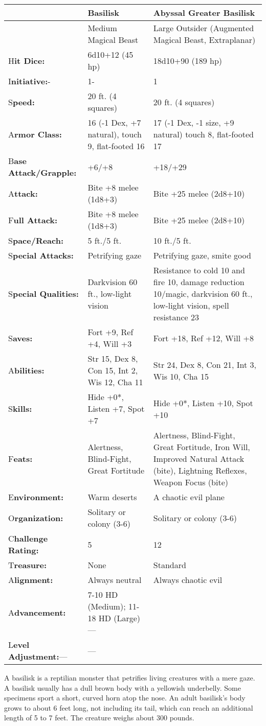 \documentclass{article}
\begin{document}
\begin{tabular}{|>{\raggedright}p{50pt}|>{\raggedright}p{134pt}|>{\raggedright}p{129pt}|}
\hline
  & B\textbf{asilisk} & A\textbf{byssal Greater Basilisk}\tabularnewline
\hline
  & Medium Magical Beast & Large Outsider (Augmented Magical Beast, Extraplanar)\tabularnewline
\hline
H\textbf{it Dice:} & 6d10+12 (45 hp) & 18d10+90 (189 hp)\tabularnewline
\hline
I\textbf{nitiative:}- & 1- & 1\tabularnewline
\hline
S\textbf{peed:} & 20 ft. (4 squares) & 20 ft. (4 squares)\tabularnewline
\hline
A\textbf{rmor Class:} & 16 (-1 Dex, +7 natural), touch 9, flat-footed 16 & 17 (-1 
Dex, -1 size, +9 natural) touch 8, flat-footed 17\tabularnewline
\hline
B\textbf{ase Attack/Grapple:} & +6/+8 & +18/+29\tabularnewline
\hline
A\textbf{ttack:} & Bite +8 melee (1d8+3) & Bite +25 melee (2d8+10)\tabularnewline
\hline
F\textbf{ull Attack:} & Bite +8 melee (1d8+3) & Bite +25 melee (2d8+10)\tabularnewline
\hline
S\textbf{pace/Reach:} & 5 ft./5 ft. & 10 ft./5 ft.\tabularnewline
\hline
S\textbf{pecial Attacks:} & Petrifying gaze & Petrifying gaze, smite good \tabularnewline
\hline
S\textbf{pecial Qualities:} & Darkvision 60 ft., low-light vision & Resistance 
to cold 10 and fire 10, damage reduction 10/magic, darkvision 60 ft., low-light 
vision, spell resistance 23\tabularnewline
\hline
S\textbf{aves:} & Fort +9, Ref +4, Will +3 & Fort +18, Ref +12, Will +8\tabularnewline
\hline
A\textbf{bilities:} & Str 15, Dex 8, Con 15, Int 2, Wis 12, Cha 11 & Str 24, Dex 
8, Con 21, Int 3, Wis 10, Cha 15\tabularnewline
\hline
S\textbf{kills:} & Hide +0*, Listen +7, Spot +7 & Hide +0*, Listen +10, Spot +10\tabularnewline
\hline
F\textbf{eats:} & Alertness, Blind-Fight, Great Fortitude & Alertness, Blind-Fight, 
Great Fortitude, Iron Will, Improved Natural Attack (bite), Lightning Reflexes, 
Weapon Focus (bite)\tabularnewline
\hline
E\textbf{nvironment:} & Warm deserts & A chaotic evil plane\tabularnewline
\hline
O\textbf{rganization:} & Solitary or colony (3-6) & Solitary or colony (3-6)\tabularnewline
\hline
C\textbf{hallenge Rating:} & 5 & 12\tabularnewline
\hline
T\textbf{reasure:} & None & Standard\tabularnewline
\hline
A\textbf{lignment:} & Always neutral & Always chaotic evil\tabularnewline
\hline
A\textbf{dvancement:} & 7-10 HD (Medium); 11-18 HD (Large)--- & \tabularnewline
\hline
L\textbf{evel Adjustment:}--- & --- & \tabularnewline
\hline
\end{tabular}

A basilisk is a reptilian monster that petrifies living creatures with a mere gaze. 
A basilisk usually has a dull brown body with a yellowish underbelly. Some specimens 
sport a short, curved horn atop the nose. An adult basilisk's body grows to about 
6 feet long, not including its tail, which can reach an additional length of 5 
to 7 feet. The creature weighs about 300 pounds.
\end{document}
